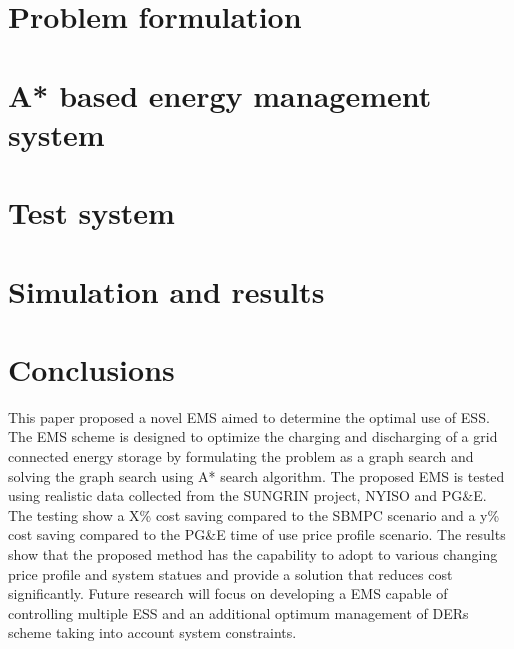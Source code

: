 \documentclass[journal]{IEEEtran}
\begin{document}
\section{Problem formulation}


\section{A* based energy management system} \label{A*}




\section{Test system} \label{sys}


\section{Simulation and results}



\section{Conclusions}
This paper proposed a novel EMS aimed to determine the optimal use of ESS. The EMS scheme is designed to optimize the charging and discharging of a grid connected energy storage by formulating the problem as a graph search and solving the graph search using A* search algorithm. The proposed EMS is tested using realistic data collected from the SUNGRIN project, NYISO and PG\&E. The testing show a X\% cost saving compared to the SBMPC scenario and a y\% cost saving compared to the PG\&E time of use price profile scenario. The results show that the proposed method has the capability to adopt to various changing price profile and system statues and provide a solution that reduces cost significantly. Future research will focus on developing a EMS capable of controlling multiple ESS and an additional optimum management of DERs scheme taking into account system constraints.


















\ifCLASSOPTIONcaptionsoff
  \newpage
\fi
\end{document}
